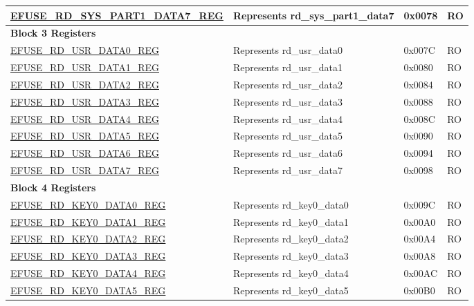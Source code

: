 \begin{longtable}{ | p{7cm} | p{6cm} | p{1.2cm} | p{1.5cm} | }
\hyperref[regdesc:EFUSERDSYSPART1DATA4TO7REG]{EFUSE\_RD\_SYS\_PART1\_DATA7\_REG} & Represents rd\_sys\_part1\_data7 & 0x0078 & RO \\ \hline
\multicolumn{4}{|l|}{\textbf{Block 3 Registers}} \\ \hline
\hyperref[regdesc:EFUSERDUSRDATANREG]{EFUSE\_RD\_USR\_DATA0\_REG} & Represents rd\_usr\_data0 & 0x007C & RO \\ \hline
\hyperref[regdesc:EFUSERDUSRDATANREG]{EFUSE\_RD\_USR\_DATA1\_REG} & Represents rd\_usr\_data1 & 0x0080 & RO \\ \hline
\hyperref[regdesc:EFUSERDUSRDATANREG]{EFUSE\_RD\_USR\_DATA2\_REG} & Represents rd\_usr\_data2 & 0x0084 & RO \\ \hline
\hyperref[regdesc:EFUSERDUSRDATANREG]{EFUSE\_RD\_USR\_DATA3\_REG} & Represents rd\_usr\_data3 & 0x0088 & RO \\ \hline
\hyperref[regdesc:EFUSERDUSRDATANREG]{EFUSE\_RD\_USR\_DATA4\_REG} & Represents rd\_usr\_data4 & 0x008C & RO \\ \hline
\hyperref[regdesc:EFUSERDUSRDATANREG]{EFUSE\_RD\_USR\_DATA5\_REG} & Represents rd\_usr\_data5 & 0x0090 & RO \\ \hline
\hyperref[regdesc:EFUSERDUSRDATANREG]{EFUSE\_RD\_USR\_DATA6\_REG} & Represents rd\_usr\_data6 & 0x0094 & RO \\ \hline
\hyperref[regdesc:EFUSERDUSRDATANREG]{EFUSE\_RD\_USR\_DATA7\_REG} & Represents rd\_usr\_data7 & 0x0098 & RO \\ \hline
\multicolumn{4}{|l|}{\textbf{Block 4 Registers}} \\ \hline
\hyperref[regdesc:EFUSERDKEY0DATANREG]{EFUSE\_RD\_KEY0\_DATA0\_REG} & Represents rd\_key0\_data0 & 0x009C & RO \\ \hline
\hyperref[regdesc:EFUSERDKEY0DATANREG]{EFUSE\_RD\_KEY0\_DATA1\_REG} & Represents rd\_key0\_data1 & 0x00A0 & RO \\ \hline
\hyperref[regdesc:EFUSERDKEY0DATANREG]{EFUSE\_RD\_KEY0\_DATA2\_REG} & Represents rd\_key0\_data2 & 0x00A4 & RO \\ \hline
\hyperref[regdesc:EFUSERDKEY0DATANREG]{EFUSE\_RD\_KEY0\_DATA3\_REG} & Represents rd\_key0\_data3 & 0x00A8 & RO \\ \hline
\hyperref[regdesc:EFUSERDKEY0DATANREG]{EFUSE\_RD\_KEY0\_DATA4\_REG} & Represents rd\_key0\_data4 & 0x00AC & RO \\ \hline
\hyperref[regdesc:EFUSERDKEY0DATANREG]{EFUSE\_RD\_KEY0\_DATA5\_REG} & Represents rd\_key0\_data5 & 0x00B0 & RO \\ \hline

\end{longtable}
